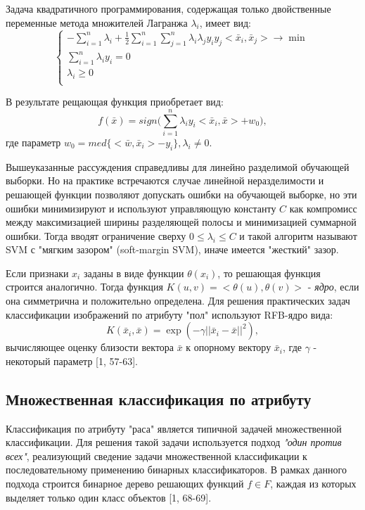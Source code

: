 \documentclass[12pt,a4paper]{article}
\begin{document}
Задача квадратичного программирования, содержащая только двойственные переменные метода множителей Лагранжа $\lambda_i$, имеет вид:
\begin{equation}
    \left\{
    \begin{array}{ll}
        -\sum_{i=1}^n{\lambda_i}+\frac{1}{2}\sum_{i=1}^n\sum_{j=1}^n{\lambda_i\lambda_jy_iy_j<\bar{x}_i,\bar{x}_j>}\rightarrow\min\\
        \sum_{i=1}^n{\lambda_iy_i}=0\\
        \lambda_i\geq0\\
    \end{array}
    \right.
\end{equation}

В результате рещающая функция приобретает вид:
\begin{equation}
    f(\bar{x})=sign(\sum_{i=1}^n{\lambda_iy_i<\bar{x}_i,\bar{x}>+w_0)},
\end{equation}
где параметр $w_0=med\{<\bar{w},\bar{x}_i>-y_i\}, \lambda_i\not=0$.

Вышеуказанные рассуждения справедливы для линейно разделимой обучающей выборки. Но на практике встречаются случае линейной неразделимости и решающей функции позволяют допускать ошибки на обучающей выборке, но эти ошибки минимизируют и используют управляющую константу $C$ как компромисс между максимизацией ширины разделяющей полосы и минимизацией суммарной ошибки. Тогда вводят ограничение сверху $0\leq\lambda_i\leq{C}$ и такой алгоритм называют SVM с "мягким зазором" (soft-margin SVM), иначе имеется "жесткий" зазор.

Если признаки $x_i$ заданы в виде функции $\theta(x_i)$, то решающая функция строится аналогично. Тогда функция $K(u,v)=<\theta(u),\theta(v)>$ - \textit{ядро}, если она симметрична и положительно определена. Для решения практических задач классификации изображений по атрибуту "пол" используют RFB-ядро вида:
\begin{equation}
    K(\bar{x}_i,\bar{x})=\exp{(-\gamma||\bar{x}_i-\bar{x}||^2)},
\end{equation}
вычисляющее оценку близости вектора $\bar{x}$ к опорному вектору $\bar{x}_i$, где $\gamma$ - некоторый параметр [1, 57-63].

\subsection{Множественная классификация по атрибуту}
Классификация по атрибуту "раса" является типичной задачей множественной классификации. Для решения такой задачи используется подход \textit{"один против всех"}, реализующий сведение задачи множественной классификации к последовательному применению бинарных классификаторов. В рамках данного подхода строится бинарное дерево решающих функций $f\in{F}$, каждая из которых выделяет только один класс объектов [1, 68-69].
\end{document}
